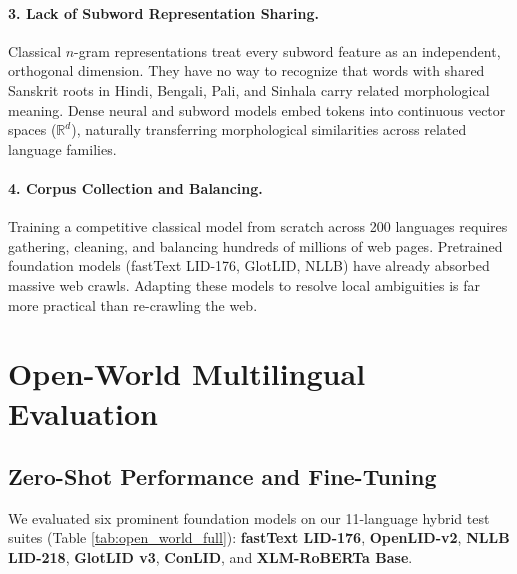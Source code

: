 \documentclass[11pt]{article}
\begin{document}
\paragraph{3. Lack of Subword Representation Sharing.}
Classical $n$-gram representations treat every subword feature as an independent, orthogonal dimension. They have no way to recognize that words with shared Sanskrit roots in Hindi, Bengali, Pali, and Sinhala carry related morphological meaning. Dense neural and subword models embed tokens into continuous vector spaces ($\mathbb{R}^d$), naturally transferring morphological similarities across related language families.

\paragraph{4. Corpus Collection and Balancing.}
Training a competitive classical model from scratch across 200 languages requires gathering, cleaning, and balancing hundreds of millions of web pages. Pretrained foundation models (fastText LID-176, GlotLID, NLLB) have already absorbed massive web crawls. Adapting these models to resolve local ambiguities is far more practical than re-crawling the web.

\section{Open-World Multilingual Evaluation}
\label{sec:open_world}

\subsection{Zero-Shot Performance and Fine-Tuning}
We evaluated six prominent foundation models on our 11-language hybrid test suites (Table \ref{tab:open_world_full}): \textbf{fastText LID-176}, \textbf{OpenLID-v2}, \textbf{NLLB LID-218}, \textbf{GlotLID v3}, \textbf{ConLID}, and \textbf{XLM-RoBERTa Base}.
\end{document}

